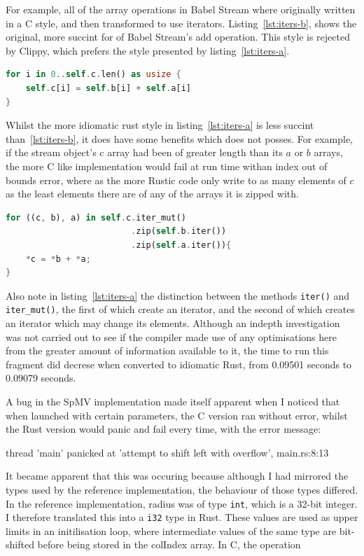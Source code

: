 For example, all of the array operations in Babel Stream where originally written in a C style, and then transformed to use iterators. Listing~\ref{lst:iters-b}, shows the original, more succint for of Babel Stream's add operation. This style is rejected by Clippy, which prefers the style presented by listing~\ref{lst:iters-a}.
\begin{lstlisting}[language=Rust, label=lst:iters-b, caption={Babel Stream Add, before applying idomatic Rust style}]
for i in 0..self.c.len() as usize {
    self.c[i] = self.b[i] + self.a[i]
}
\end{lstlisting}
Whilst the more idiomatic rust style in listing~\ref{lst:iters-a} is less succint than~\ref{lst:iters-b}, it does have some benefits which does not posses. For example, if the stream object's c array had been of greater length than its $a$ or $b$ arrays, the more C like implementation would fail at run time withan index out of bounds error, where as the more Rustic code only write to as many elements of $c$ as the least elements there are of any of the arrays it is zipped with.
\begin{lstlisting}[language=Rust, label=lst:iters-a, caption={Babel Stream Add, after applying idomatic Rust style}]
for ((c, b), a) in self.c.iter_mut()
                         .zip(self.b.iter())
                         .zip(self.a.iter()){
    *c = *b + *a;
}
\end{lstlisting}
Also note in listing~\ref{lst:iters-a} the distinction between the methods \texttt{iter()} and \texttt{iter\_mut()}, the first of which create an iterator, and the second of which creates an iterator which may change its elements. Although an indepth investigation was not carried out to see if the compiler made use of any optimisations here from the greater amount of information available to it, the time to run this fragment did decrese when converted to idiomatic Rust, from 0.09501 seconds to 0.09079 seconds.

A bug in the SpMV implementation made itself apparent when I noticed that when launched with certain parameters, the C version ran without error, whilst the Rust version would panic and fail every time, with the error message:

thread 'main' panicked at 'attempt to shift left with overflow', main.rs:8:13

It became apparent that this was occuring because although I had mirrored the types used by the reference implementation, the behaviour of those types differed. In the reference implementation, radius was of type \texttt{int}, which is a 32-bit integer. I therefore translated this into a \texttt{i32} type in Rust. These values are used as upper limits in an initilisation loop, where intermediate values of the same type are bit-shifted before being stored in the colIndex array. In C, the operation

